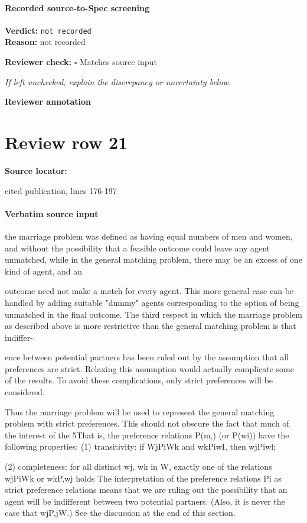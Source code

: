 \documentclass[10pt]{article}
\newcommand{\reviewerbox}{%
  \par\noindent\fbox{\parbox{0.96\linewidth}{\rule{0pt}{0.38in}}}\par
}
\newcommand{\reviewmatch}[1]{%
  \par\noindent\textbf{Reviewer check:} $\square$\; #1\par
  \noindent\emph{If left unchecked, explain the discrepancy or uncertainty below.}\par
}
\begin{document}
\paragraph{Recorded source-to-Spec screening}
\textbf{Verdict:} \texttt{not recorded}
\\
\textbf{Reason:} not recorded
\reviewmatch{Matches source input}
\noindent\textbf{Reviewer annotation}\par
\reviewerbox
\clearpage
\hypertarget{source-claim-5a318a92fe832efb}{}
\section*{Review row 21}
\textbf{Source locator:} {\footnotesize\raggedright cited publication, lines 176-\allowbreak{}197\par}
\paragraph{Verbatim source input}
\begin{ReviewVerbatim}
the marriage problem was defined as having equal numbers of men and women, and
without the possibility that a feasible outcome could leave any agent unmatched, while
in the general matching problem, there may be an excess of one kind of agent, and an

outcome need not make a match for every agent. This more general case can be
handled by adding suitable "dummy" agents corresponding to the option of being
unmatched in the final outcome. The third respect in which the marriage problem as
described above is more restrictive than the general matching problem is that indiffer-

ence between potential partners has been ruled out by the assumption that all
preferences are strict. Relaxing this assumption would actually complicate some of the
results. To avoid these complications, only strict preferences will be considered.

Thus the marriage problem will be used to represent the general matching problem
with strict preferences. This should not obscure the fact that much of the interest of the
5That is, the preference relations P(m,) (or P(wi)) have the following properties:
(1) transitivity: if WjPiWk and wkPiwI, then wjPiwl;

(2) completeness: for all distinct wj, wk in W, exactly one of the relations wjPiWk or wkP,wj holds
The interpretation of the preference relations Pi as strict preference relations means that we are ruling out
the possibility that an agent will be indifferent between two potential partners. (Also, it is never the case that
wjP.jW.) See the discussion at the end of this section.
\end{ReviewVerbatim}
\end{document}
